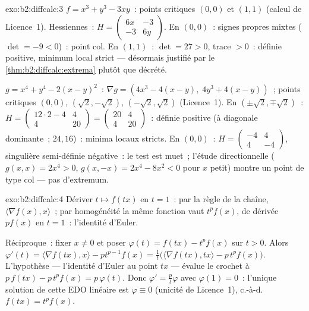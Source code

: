 \begin{solution}{exo:b2:diffcalc:3}
$f = x^3 + y^3 - 3xy$~: points critiques $(0,0)$ et $(1,1)$ (calcul
de Licence~1). Hessiennes~: $H = \begin{pmatrix} 6x & -3\\ -3 &
6y\end{pmatrix}$. En $(0,0)$~: signes propres mixtes ($\det = -9 < 0$)~:
point col. En $(1,1)$~: $\det = 27 > 0$, trace $> 0$~: définie
positive, minimum local strict --- désormais justifié par le
\cref{thm:b2:diffcalc:extrema} plutôt que décrété.

$g = x^4 + y^4 - 2(x-y)^2$~: $\nabla g = (4x^3 - 4(x - y),\; 4y^3 +
4(x-y))$~; points critiques $(0,0)$, $(\sqrt2, -\sqrt2)$,
$(-\sqrt2, \sqrt2)$ (Licence~1). En $(\pm\sqrt2, \mp\sqrt2)$~: $H =
\begin{pmatrix} 12\cdot2 - 4 & 4\\ 4 & 20\end{pmatrix} =
\begin{pmatrix} 20 & 4\\ 4 & 20\end{pmatrix}$~: définie positive
(à diagonale dominante~;  $24, 16$)~: minima locaux
stricts. En $(0,0)$~: $H = \begin{pmatrix} -4 & 4\\ 4 & -4\end{pmatrix}$,
singulière semi-définie négative~: le test est muet~; l'étude
directionnelle ($g(x,x) = 2x^4 > 0$, $g(x,-x) = 2x^4 - 8x^2 < 0$
pour $x$ petit) montre un point de type col --- pas d'extremum.
\end{solution}

\begin{solution}{exo:b2:diffcalc:4}
Dériver $t \mapsto f(tx)$ en $t = 1$~: par la règle de la chaîne,
$\langle \nabla f(x), x\rangle$~; par homogénéité la même fonction
vaut $t^pf(x)$, de dérivée $pf(x)$ en $t = 1$~: l'identité d'Euler.

Réciproque~: fixer $x \neq 0$ et poser $\varphi(t) = f(tx) - t^p f(x)$
sur $t > 0$. Alors $\varphi'(t) = \langle\nabla f(tx), x\rangle -
pt^{p-1}f(x) = \frac1t\bigl(\langle \nabla f(tx), tx\rangle -
p\,t^pf(x)\bigr)$. L'hypothèse --- l'identité d'Euler au point
$tx$ --- évalue le crochet à $p\,f(tx) - p\,t^pf(x) =
p\,\varphi(t)$. Donc $\varphi' = \frac{p}{t}\varphi$ avec $\varphi(1)
= 0$~: l'unique solution de cette EDO linéaire est $\varphi \equiv 0$
(unicité de Licence~1), c.-à-d.\ $f(tx) = t^pf(x)$.
\end{solution}

